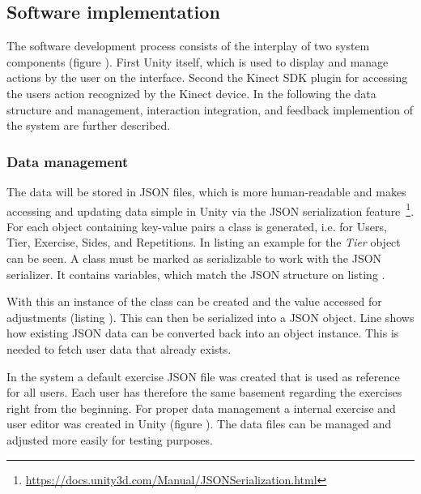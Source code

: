 \subsection{Software implementation}
The software development process consists of the interplay of two system components (figure ). First Unity itself, which is used to display and manage actions by the user on the interface. Second the Kinect SDK plugin for accessing the users action recognized by the Kinect device. In the following the data structure and management, interaction integration, and feedback implemention of the system are further described.

\subsubsection{Data management}
The data will be stored in JSON files, which is more human-readable and makes accessing and updating data simple in Unity via the JSON serialization feature~\footnote{\url{https://docs.unity3d.com/Manual/JSONSerialization.html}}. For each object containing key-value pairs a class is generated, i.e. for Users, Tier, Exercise, Sides, and Repetitions. In listing  an example for the \textit{Tier} object can be seen. A class must be marked as serializable to work with the JSON serializer. It contains variables, which match the JSON structure on listing . 

With this an instance of the class can be created and the value accessed for adjustments (listing ). This can then be serialized into a JSON object. Line  shows how existing JSON data can be converted back into an object instance. This is needed to fetch user data that already exists.


In the system a default exercise JSON file was created that is used as reference for all users. Each user has therefore the same basement regarding the exercises right from the beginning. For proper data management a internal exercise and user editor was created in Unity (figure ). The data files can be managed and adjusted more easily for testing purposes.

